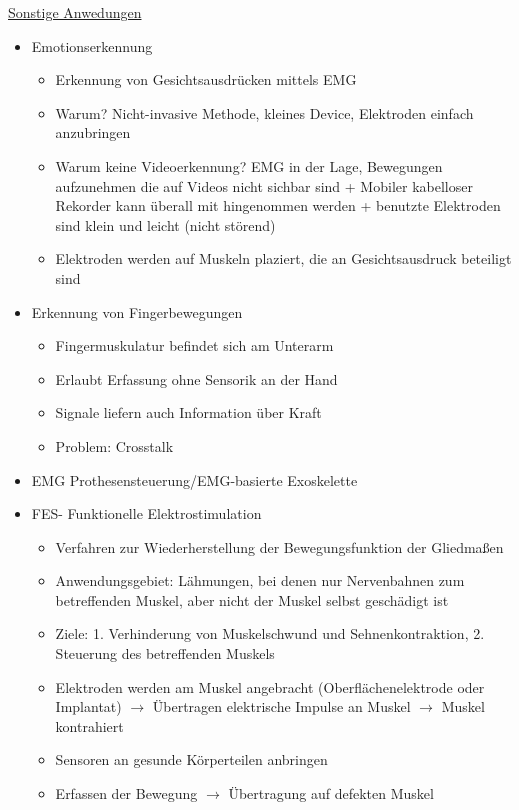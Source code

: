 \documentclass[a4paper,10pt,oneside]{article}
\begin{document}
\underline{Sonstige Anwedungen} \\
	\begin{itemize}
		\item Emotionserkennung
			\begin{itemize}
				\item Erkennung von Gesichtsausdrücken mittels EMG
				\item Warum? Nicht-invasive Methode, kleines Device, Elektroden einfach anzubringen
				\item Warum keine Videoerkennung? EMG in der Lage, Bewegungen aufzunehmen die auf Videos nicht sichbar sind + Mobiler kabelloser Rekorder kann überall mit hingenommen werden + benutzte Elektroden sind klein und leicht (nicht störend)
				\item Elektroden werden auf Muskeln plaziert, die an Gesichtsausdruck beteiligt sind
			\end{itemize}
		\item Erkennung von Fingerbewegungen
			\begin{itemize}
				\item Fingermuskulatur befindet sich am Unterarm
				\item Erlaubt Erfassung ohne Sensorik an der Hand
				\item Signale liefern auch Information über Kraft
				\item Problem: Crosstalk
			\end{itemize}
		\item EMG Prothesensteuerung/EMG-basierte Exoskelette
		\item FES- Funktionelle Elektrostimulation
			\begin{itemize}
				\item Verfahren zur Wiederherstellung der Bewegungsfunktion der Gliedmaßen
				\item Anwendungsgebiet: Lähmungen, bei denen nur Nervenbahnen zum betreffenden Muskel, aber nicht der Muskel selbst geschädigt ist
				\item Ziele: 1. Verhinderung von Muskelschwund und Sehnenkontraktion, 2. Steuerung des betreffenden Muskels
				\item Elektroden werden am Muskel angebracht (Oberflächenelektrode oder Implantat) $\rightarrow$ Übertragen elektrische Impulse an Muskel $\rightarrow$ Muskel kontrahiert
				\item Sensoren an gesunde Körperteilen anbringen 
				\item Erfassen der Bewegung $\rightarrow$ Übertragung auf defekten Muskel
			\end{itemize}
	\end{itemize}
 		
 		
 		
 		
 		
 		
 		
 		
 		
 		
 		
 		
 		
 		
 		
 		
 		
 		
 		
 		
 	

 
\end{document}
